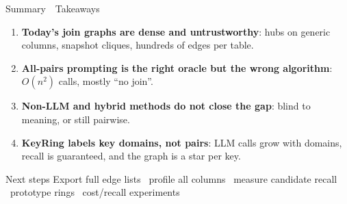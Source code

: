 \documentclass[aspectratio=169]{beamer}
\newcommand{\apptitle}[3]{\textcolor{#1}{#2}~\textcolor{black!30}{\textbar}~#3}
\begin{document}
\begin{frame}{\apptitle{black!60}{Summary}{Takeaways}}
\footnotesize
\vspace{3mm}
\begin{enumerate}\setlength\itemsep{8pt}
  \item \textbf{Today's join graphs are dense and untrustworthy}: hubs on generic columns, snapshot cliques, hundreds of edges per table.
  \item \textbf{All-pairs prompting is the right oracle but the wrong algorithm}: $O(n^2)$ calls, mostly ``no join''.
  \item \textbf{Non-LLM and hybrid methods do not close the gap}: blind to meaning, or still pairwise.
  \item \textbf{KeyRing labels key domains, not pairs}: LLM calls grow with domains, recall is guaranteed, and the graph is a star per key.
\end{enumerate}
\vspace{4mm}
\begin{block}{Next steps}
\vspace{1mm}
Export full edge lists \faAngleRight\ profile all columns \faAngleRight\ measure candidate recall \faAngleRight\ prototype rings \faAngleRight\ cost/recall experiments
\vspace{1mm}
\end{block}
\end{frame}

\fi
\end{document}

